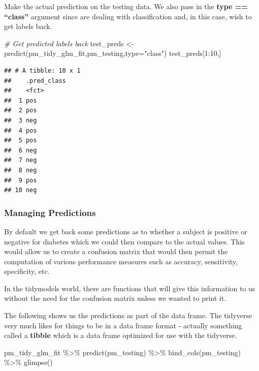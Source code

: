 \documentclass[
]{article}
\newenvironment{Shaded}{\begin{snugshade}}{\end{snugshade}}
\newcommand{\AttributeTok}[1]{\textcolor[rgb]{0.77,0.63,0.00}{#1}}
\newcommand{\CommentTok}[1]{\textcolor[rgb]{0.56,0.35,0.01}{\textit{#1}}}
\newcommand{\DecValTok}[1]{\textcolor[rgb]{0.00,0.00,0.81}{#1}}
\newcommand{\FunctionTok}[1]{\textcolor[rgb]{0.00,0.00,0.00}{#1}}
\newcommand{\NormalTok}[1]{#1}
\newcommand{\OtherTok}[1]{\textcolor[rgb]{0.56,0.35,0.01}{#1}}
\newcommand{\SpecialCharTok}[1]{\textcolor[rgb]{0.00,0.00,0.00}{#1}}
\newcommand{\StringTok}[1]{\textcolor[rgb]{0.31,0.60,0.02}{#1}}
\begin{document}
Make the actual prediction on the testing data. We also pass in the
\textbf{type == ``class''} argument since are dealing with
classification and, in this case, wish to get labels back.

\begin{Shaded}
\begin{Highlighting}[]
\CommentTok{\# Get predicted labels back}
\NormalTok{test\_preds }\OtherTok{\textless{}{-}} \FunctionTok{predict}\NormalTok{(pm\_tidy\_glm\_fit,pm\_testing,}\AttributeTok{type=}\StringTok{"class"}\NormalTok{)}
\NormalTok{test\_preds[}\DecValTok{1}\SpecialCharTok{:}\DecValTok{10}\NormalTok{,]}
\end{Highlighting}
\end{Shaded}

\begin{verbatim}
## # A tibble: 10 x 1
##    .pred_class
##    <fct>      
##  1 pos        
##  2 pos        
##  3 neg        
##  4 pos        
##  5 pos        
##  6 neg        
##  7 neg        
##  8 neg        
##  9 pos        
## 10 neg
\end{verbatim}

\hypertarget{managing-predictions}{%
\subsubsection{Managing Predictions}\label{managing-predictions}}

By default we get back some predictions as to whether a subject is
positive or negative for diabetes which we could then compare to the
actual values. This would allow us to create a confusion matrix that
would then permit the computation of various performance measures such
as accuracy, sensitivity, specificity, etc.

In the tidymodels world, there are functions that will give this
information to us without the need for the confusion matrix unless we
wanted to print it.

The following shows us the predictions as part of the data frame. The
tidyverse very much likes for things to be in a data frame format -
actually something called a \textbf{tibble} which is a data frame
optimized for use with the tidyverse.

\begin{Shaded}
\begin{Highlighting}[]
\NormalTok{pm\_tidy\_glm\_fit }\SpecialCharTok{\%\textgreater{}\%}
  \FunctionTok{predict}\NormalTok{(pm\_testing) }\SpecialCharTok{\%\textgreater{}\%}
  \FunctionTok{bind\_cols}\NormalTok{(pm\_testing) }\SpecialCharTok{\%\textgreater{}\%}
  \FunctionTok{glimpse}\NormalTok{()}
\end{Highlighting}
\end{Shaded}
\end{document}
